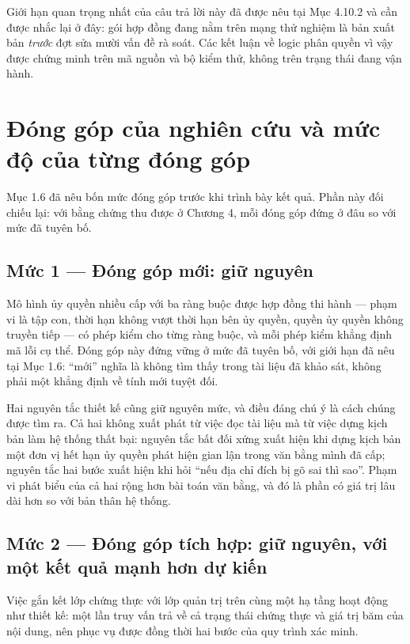 Giới hạn quan trọng nhất của câu trả lời này đã được nêu tại Mục 4.10.2 và cần được nhắc lại ở đây: gói hợp đồng đang nằm trên mạng thử nghiệm là bản xuất bản \emph{trước} đợt sửa mười vấn đề rà soát. Các kết luận về logic phân quyền vì vậy được chứng minh trên mã nguồn và bộ kiểm thử, không trên trạng thái đang vận hành.

\section{Đóng góp của nghiên cứu và mức độ của từng đóng góp}

Mục 1.6 đã nêu bốn mức đóng góp trước khi trình bày kết quả. Phần này đối chiếu lại: với bằng chứng thu được ở Chương 4, mỗi đóng góp đứng ở đâu so với mức đã tuyên bố.



\subsection{Mức 1 --- Đóng góp mới: giữ nguyên}

Mô hình ủy quyền nhiều cấp với ba ràng buộc được hợp đồng thi hành --- phạm vi là tập con, thời hạn không vượt thời hạn bên ủy quyền, quyền ủy quyền không truyền tiếp --- có phép kiểm cho từng ràng buộc, và mỗi phép kiểm khẳng định mã lỗi cụ thể. Đóng góp này đứng vững ở mức đã tuyên bố, với giới hạn đã nêu tại Mục 1.6: {``}mới{''} nghĩa là không tìm thấy trong tài liệu đã khảo sát, không phải một khẳng định về tính mới tuyệt đối.

Hai nguyên tắc thiết kế cũng giữ nguyên mức, và điều đáng chú ý là cách chúng được tìm ra. Cả hai không xuất phát từ việc đọc tài liệu mà từ việc dựng kịch bản làm hệ thống thất bại: nguyên tắc bất đối xứng xuất hiện khi dựng kịch bản một đơn vị hết hạn ủy quyền phát hiện gian lận trong văn bằng mình đã cấp; nguyên tắc hai bước xuất hiện khi hỏi {``}nếu địa chỉ đích bị gõ sai thì sao{''}. Phạm vi phát biểu của cả hai rộng hơn bài toán văn bằng, và đó là phần có giá trị lâu dài hơn so với bản thân hệ thống.

\subsection{Mức 2 --- Đóng góp tích hợp: giữ nguyên, với một kết quả mạnh hơn dự kiến}

Việc gắn kết lớp chứng thực với lớp quản trị trên cùng một hạ tầng hoạt động như thiết kế: một lần truy vấn trả về cả trạng thái chứng thực và giá trị băm của nội dung, nên phục vụ được đồng thời hai bước của quy trình xác minh.

